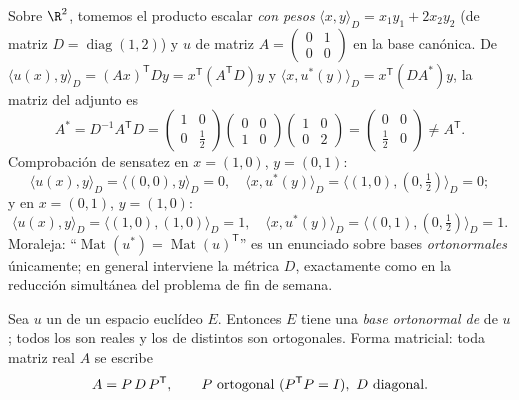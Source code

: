 \begin{example}\label{ex:b2:quadratic:weightedadjoint}
Sobre $\R^2$, tomemos el producto escalar \emph{con pesos} $\langle
x, y\rangle_D = x_1y_1 + 2x_2y_2$ (de matriz $D =
\operatorname{diag}(1,2)$) y $u$ de matriz $A = \begin{pmatrix} 0 &
1\\ 0 & 0\end{pmatrix}$ en la base canónica. De $\langle u(x),
y\rangle_D = (Ax)^{\mathsf T}Dy = x^{\mathsf T}(A^{\mathsf T}D)y$ y
$\langle x, u^*(y)\rangle_D = x^{\mathsf T}(DA^*)y$, la matriz del
adjunto es
\[
A^* = D^{-1}A^{\mathsf T}D
= \begin{pmatrix} 1 & 0\\ 0 & \tfrac12\end{pmatrix}
\begin{pmatrix} 0 & 0\\ 1 & 0\end{pmatrix}
\begin{pmatrix} 1 & 0\\ 0 & 2\end{pmatrix}
= \begin{pmatrix} 0 & 0\\ \tfrac12 & 0\end{pmatrix}
\neq A^{\mathsf T} .
\]
Comprobación de sensatez en $x = (1,0)$, $y = (0,1)$:
\[
\langle u(x), y\rangle_D = \langle (0,0), y\rangle_D = 0,
\quad
\langle x, u^*(y)\rangle_D
= \langle(1,0), (0,\tfrac12)\rangle_D = 0 ;
\]
y en $x = (0,1)$, $y = (1,0)$:
\[
\langle u(x), y\rangle_D = \langle(1,0),(1,0)\rangle_D = 1,
\quad
\langle x, u^*(y)\rangle_D =
\langle(0,1),(0,\tfrac12)\rangle_D = 1 .
\] Moraleja: ``$\operatorname{Mat}(u^*) =
\operatorname{Mat}(u)^{\mathsf T}$'' es un enunciado sobre bases
\emph{ortonormales} únicamente; en general interviene la métrica
$D$, exactamente como en la reducción simultánea del problema de fin
de semana.
\end{example}

\begin{theorem}\label{thm:b2:quadratic:spectral}
Sea $u$ un  de un espacio euclídeo $E$.
Entonces $E$ tiene una \emph{base ortonormal de }
de $u$; todos los  son reales y los  de  distintos son ortogonales. Forma
matricial: toda matriz real  $A$ se escribe
\[
A = P\,D\,P^{\mathsf T},
\qquad P \text{ ortogonal } (P^{\mathsf T} P = I),\ D
\text{ diagonal}.\index{teorema espectral}
\]
\end{theorem}

